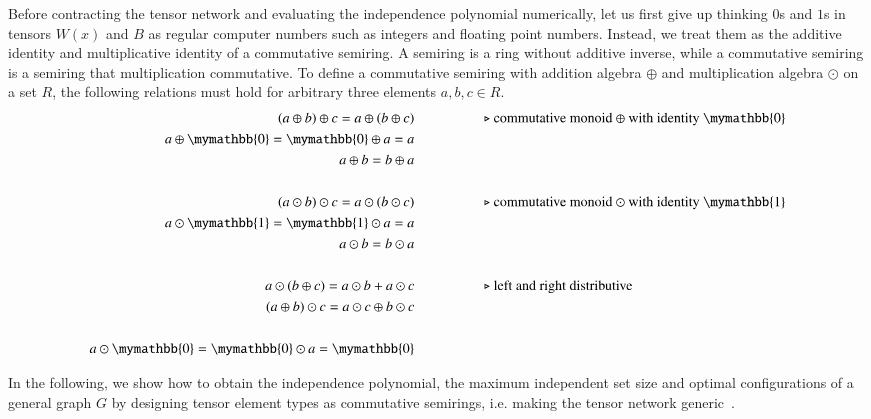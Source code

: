 \documentclass[review,onefignum,onetabnum]{siamart190516}
\newcommand{\<}{\langle}
\renewcommand{\>}{\rangle}
\begin{document}
Before contracting the tensor network and evaluating the independence polynomial numerically, let us first give up thinking $0$s and $1$s in tensors $W(x)$ and $B$ as regular computer numbers such as integers and floating point numbers.
Instead, we treat them as the additive identity and multiplicative identity of a commutative semiring.
A semiring is a ring without additive inverse, while a commutative semiring is a semiring that multiplication commutative.
To define a commutative semiring with addition algebra $\oplus$ and multiplication algebra $\odot$ on a set $R$, the following relations must hold for arbitrary three elements $a, b, c \in R$.
\begin{align*}
(a \oplus b) \oplus c = a \oplus (b \oplus c) & \hspace{5em}\text{$\triangleright$ commutative monoid $\oplus$ with identity $\mymathbb{0}$}\\
a \oplus \mymathbb{0} = \mymathbb{0} \oplus a = a &\\
a \oplus b = b \oplus a &\\
&\\
(a \odot b) \odot c = a \odot (b \odot c)  &   \hspace{5em}\text{$\triangleright$ commutative monoid $\odot$ with identity $\mymathbb{1}$}\\
a \odot  \mymathbb{1} =  \mymathbb{1} \odot a = a &\\
a \odot b = b \odot a &\\
&\\
a \odot (b\oplus c) = a\odot b + a\odot c  &  \hspace{5em}\text{$\triangleright$ left and right distributive}\\
(a\oplus b) \odot c = a\odot c \oplus b\odot c &\\
&\\
a \odot \mymathbb{0} = \mymathbb{0} \odot a = \mymathbb{0}
\end{align*}

In the following, we show how to obtain the independence polynomial, the maximum independent set size and optimal configurations of a general graph $G$ by designing tensor element types as commutative semirings,
i.e. making the tensor network generic~\cite{Stepanov2014}.
\end{document}
